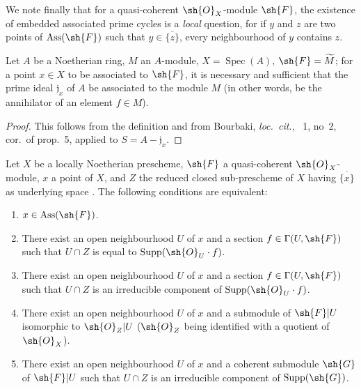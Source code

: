 We note finally that for a quasi-coherent $\sh{O}_X$-module $\sh{F}$, the existence of embedded associated prime cycles is a \emph{local} question, for if $y$ and $z$ are two points of $\operatorname{Ass}(\sh{F})$ such that $y\in\overline{\{z\}}$, every neighbourhood of $y$ contains $z$.

\begin{proposition}[3.1.2]
\label{IV.3.1.2}
Let $A$ be a Noetherian ring, $M$ an $A$-module, $X=\operatorname{Spec}(A)$, $\sh{F}=\widetilde{M}$; for a point $x\in X$ to be associated to $\sh{F}$, it is necessary and sufficient that the prime ideal $\mathfrak{j}_x$ of $A$ be associated to the module $M$ (in other words, be the annihilator of an element $f\in M$).
\end{proposition}

\begin{proof}
This follows from the definition  and from Bourbaki, \emph{loc.\ cit.}, \textsection~1, no~2, cor.\ of prop.~5, applied to $S=A-\mathfrak{j}_x$.
\end{proof}

\begin{proposition}[3.1.3]
\label{IV.3.1.3}
Let $X$ be a locally Noetherian prescheme, $\sh{F}$ a quasi-coherent $\sh{O}_X$-module, $x$ a point of $X$, and $Z$ the reduced closed sub-prescheme of $X$ having $\overline{\{x\}}$ as underlying space .
The following conditions are equivalent:
\begin{enumerate}
  \item[\emph{a)}] $x\in\operatorname{Ass}(\sh{F})$.
  \item[\emph{b)}] There exist an open neighbourhood $U$ of $x$ and a section $f\in\Gamma(U,\sh{F})$ such that $U\cap Z$ is equal to $\operatorname{Supp}(\sh{O}_U\cdot f)$.
  \item[\emph{b$'$)}] There exist an open neighbourhood $U$ of $x$ and a section $f\in\Gamma(U,\sh{F})$ such that $U\cap Z$ is an irreducible component of $\operatorname{Supp}(\sh{O}_U\cdot f)$.
  \item[\emph{c)}] There exist an open neighbourhood $U$ of $x$ and a submodule of $\sh{F}|U$ isomorphic to $\sh{O}_Z|U$ ($\sh{O}_Z$ being identified with a quotient of $\sh{O}_X$).
  \item[\emph{c$'$)}] There exist an open neighbourhood $U$ of $x$ and a coherent submodule $\sh{G}$ of $\sh{F}|U$ such that $U\cap Z$ is an irreducible component of $\operatorname{Supp}(\sh{G})$.
\end{enumerate}
\end{proposition}

